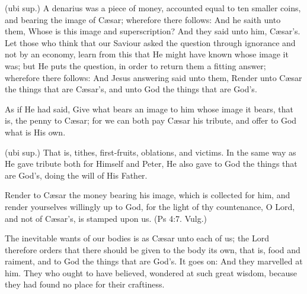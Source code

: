  (ubi sup.) A denarius was a piece of money, accounted equal to ten smaller coins, and bearing the image of Cæsar; wherefore there follows: And he saith unto them, Whose is this image and superscription? And they said unto him, Cæsar’s. Let those who think that our Saviour asked the question through ignorance and not by an economy, learn from this that He might have known whose image it was; but He puts the question, in order to return them a fitting answer; wherefore there follows: And Jesus answering said unto them, Render unto Cæsar the things that are Cæsar’s, and unto God the things that are God’s.

 As if He had said, Give what bears an image to him whose image it bears, that is, the penny to Cæsar; for we can both pay Cæsar his tribute, and offer to God what is His own.

 (ubi sup.) That is, tithes, first-fruits, oblations, and victims. In the same way as He gave tribute both for Himself and Peter, He also gave to God the things that are God’s, doing the will of His Father.

 Render to Cæsar the money bearing his image, which is collected for him, and render yourselves willingly up to God, for the light of thy countenance, O Lord, and not of Cæsar’s, is stamped upon us. (Ps 4:7. Vulg.)

 The inevitable wants of our bodies is as Cæsar unto each of us; the Lord therefore orders that there should be given to the body its own, that is, food and raiment, and to God the things that are God’s. It goes on: And they marvelled at him. They who ought to have believed, wondered at such great wisdom, because they had found no place for their craftiness.

 

